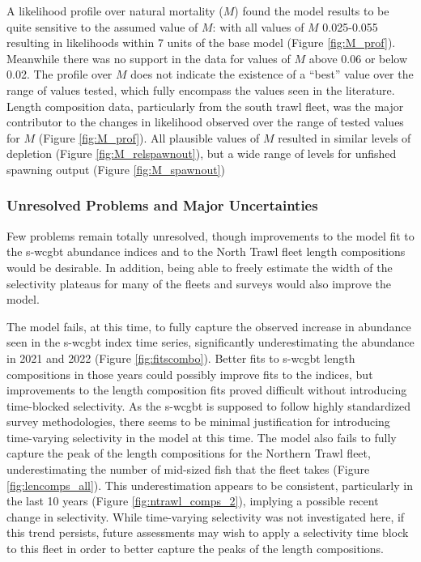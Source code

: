 \documentclass[11pt,
  letterpaper,
]{article}
\begin{document}
A likelihood profile over natural mortality (\(M\)) found the model results to be quite sensitive to the assumed value of \(M\): with all values of \(M\) 0.025-0.055 resulting in likelihoods within 7 units of the base model (Figure \ref{fig:M_prof}). Meanwhile there was no support in the data for values of \(M\) above 0.06 or below 0.02. The profile over \(M\) does not indicate the existence of a ``best'' value over the range of values tested, which fully encompass the values seen in the literature. Length composition data, particularly from the south trawl fleet, was the major contributor to the changes in likelihood observed over the range of tested values for \(M\) (Figure \ref{fig:M_prof}). All plausible values of \(M\) resulted in similar levels of depletion (Figure \ref{fig:M_relspawnout}), but a wide range of levels for unfished spawning output (Figure \ref{fig:M_spawnout})

\hypertarget{unresolved-problems-and-major-uncertainties-1}{%
\subsubsection{Unresolved Problems and Major Uncertainties}\label{unresolved-problems-and-major-uncertainties-1}}

Few problems remain totally unresolved, though improvements to the model fit to the \gls{s-wcgbt} abundance indices and to the North Trawl fleet length compositions would be desirable. In addition, being able to freely estimate the width of the selectivity plateaus for many of the fleets and surveys would also improve the model.

The model fails, at this time, to fully capture the observed increase in abundance seen in the \gls{s-wcgbt} index time series, significantly underestimating the abundance in 2021 and 2022 (Figure \ref{fig:fitscombo}). Better fits to \gls{s-wcgbt} length compositions in those years could possibly improve fits to the indices, but improvements to the length composition fits proved difficult without introducing time-blocked selectivity. As the \gls{s-wcgbt} is supposed to follow highly standardized survey methodologies, there seems to be minimal justification for introducing time-varying selectivity in the model at this time. The model also fails to fully capture the peak of the length compositions for the Northern Trawl fleet, underestimating the number of mid-sized fish that the fleet takes (Figure \ref{fig:lencomps_all}). This underestimation appears to be consistent, particularly in the last 10 years (Figure \ref{fig:ntrawl_comps_2}), implying a possible recent change in selectivity. While time-varying selectivity was not investigated here, if this trend persists, future assessments may wish to apply a selectivity time block to this fleet in order to better capture the peaks of the length compositions.
\end{document}
